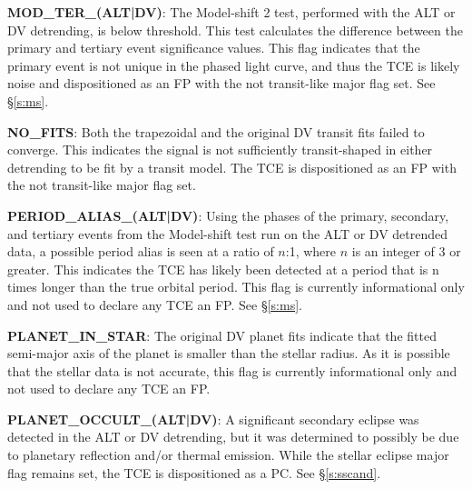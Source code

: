 \textbf{MOD\_TER\_(ALT|DV)}: The Model-shift 2 test, performed with the ALT or DV detrending, is below threshold. This test calculates the difference between the primary and tertiary event significance values. This flag indicates that the primary event is not unique in the phased light curve, and thus the TCE is likely noise and dispositioned as an FP with the not transit-like major flag set. See \S\ref{s:ms}.


\textbf{NO\_FITS}: Both the trapezoidal and the original DV transit fits failed to converge. This indicates the signal is not sufficiently transit-shaped in either detrending to be fit by a transit model. The TCE is dispositioned as an FP with the not transit-like major flag set.

\textbf{PERIOD\_ALIAS\_(ALT|DV)}: Using the phases of the primary, secondary, and tertiary events from the Model-shift test run on the ALT or DV detrended data, a possible period alias is seen at a ratio of $n$:1, where $n$ is an integer of 3 or greater. This indicates the TCE has likely been detected at a period that is n times longer than the true orbital period. This flag is currently informational only and not used to declare any TCE an FP. See \S\ref{s:ms}.


\textbf{PLANET\_IN\_STAR}: The original DV planet fits indicate that the fitted semi-major axis of the planet is smaller than the stellar radius. As it is possible that the stellar data is not accurate, this flag is currently informational only and not used to declare any TCE an FP.

\textbf{PLANET\_OCCULT\_(ALT|DV)}: A significant secondary eclipse was detected in the ALT or DV detrending, but it was determined to possibly be due to planetary reflection and/or thermal emission. While the stellar eclipse major flag remains set, the TCE is dispositioned as a PC. See \S\ref{s:sscand}.

